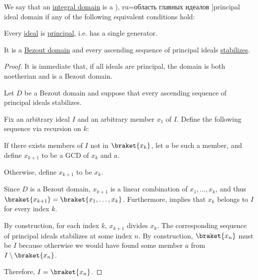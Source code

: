 \begin{definition}\label{def:principal_ideal_domain}
  We say that an \hyperref[def:integral_domain]{integral domain} is a \term[bg=област на главни идеали (\cite[def. VI.3]{ГеновМиховскиМоллов1991Алгебра}), ru=область главных идеалов \cite[def. 9.3]{Винберг2014КурсАлгебры}]{principal ideal domain} if any of the following equivalent conditions hold:
  \begin{thmenum}
     Every \hyperref[def:semiring_ideal]{ideal} is \hyperref[def:semiring_ideal/principal]{principal}, i.e. has a single generator.

     It is a \hyperref[def:bezout_domain]{Bezout domain} and every ascending sequence of principal ideals \hyperref[def:stabilizing_sequence]{stabilizes}.
  \end{thmenum}
\end{definition}
\begin{proof}
   It is immediate that, if all ideals are principal, the domain is both noetherian and is a Bezout domain.

   Let \( D \) be a Bezout domain and suppose that every ascending sequence of principal ideals stabilizes.

  Fix an arbitrary ideal \( I \) and an arbitrary member \( x_1 \) of \( I \). Define the following sequence via recursion on \( k \):
  \begin{displayquote}
    If there exists members of \( I \) not in \( \braket{ x_k } \), let \( a \) be such a member, and define \( x_{k+1} \) to be a GCD of \( x_k \) and \( a \).

    Otherwise, define \( x_{k+1} \) to be \( x_k \).
  \end{displayquote}

  Since \( D \) is a Bezout domain, \( x_{k+1} \) is a linear combination of \( x_1, \ldots, x_k \), and thus \( \braket{ x_{k+1} } = \braket{ x_1, \ldots, x_k } \). Furthermore,  implies that \( x_k \) belongs to \( I \) for every index \( k \).

  By construction, for each index \( k \), \( x_{k+1} \) divides \( x_k \). The corresponding sequence of principal ideals stabilizes at some index \( n \). By construction, \( \braket{ x_n } \) must be \( I \) because otherwise we would have found some member \( a \) from \( I \setminus \braket{ x_n } \).

  Therefore, \( I = \braket{ x_n } \).
\end{proof}

